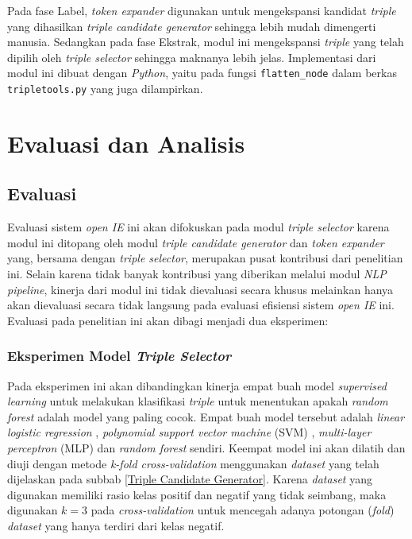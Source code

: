Pada fase Label, \textit{token expander} digunakan untuk mengekspansi kandidat \textit{triple} yang dihasilkan \textit{triple candidate generator} sehingga lebih mudah dimengerti manusia. Sedangkan pada fase Ekstrak, modul ini mengekspansi \textit{triple} yang telah dipilih oleh \textit{triple selector} sehingga maknanya lebih jelas. Implementasi dari modul ini dibuat dengan \textit{Python}, yaitu pada fungsi \verb|flatten_node| dalam berkas \verb|tripletools.py| yang juga dilampirkan.

\section{Evaluasi dan Analisis}

\subsection{Evaluasi}

Evaluasi sistem \textit{open IE} ini akan difokuskan pada modul \textit{triple selector} karena modul ini ditopang oleh modul \textit{triple candidate generator} dan \textit{token expander} yang, bersama dengan \textit{triple selector}, merupakan pusat kontribusi dari penelitian ini. Selain karena tidak banyak kontribusi yang diberikan melalui modul \textit{NLP pipeline}, kinerja dari modul ini tidak dievaluasi secara khusus melainkan hanya akan dievaluasi secara tidak langsung pada evaluasi efisiensi sistem \textit{open IE} ini. Evaluasi pada penelitian ini akan dibagi menjadi dua eksperimen:

\subsubsection{Eksperimen Model \textit{Triple Selector}}

Pada eksperimen ini akan dibandingkan kinerja empat buah model \textit{supervised learning} untuk melakukan klasifikasi \textit{triple} untuk menentukan apakah \textit{random forest} \citep{wasserman2015grid} adalah model yang paling cocok. Empat buah model tersebut adalah \textit{linear logistic regression}  \citep{fan2008liblinear}, \textit{polynomial support vector machine} (SVM) \citep{chang2011libsvm}, \textit{multi-layer perceptron} (MLP) \citep{hinton1989connectionist} dan \textit{random forest} sendiri. Keempat model ini akan dilatih dan diuji dengan metode \textit{k-fold cross-validation} menggunakan \textit{dataset} yang telah dijelaskan pada subbab \ref{Triple Candidate Generator}. Karena \textit{dataset} yang digunakan memiliki rasio kelas positif dan negatif yang tidak seimbang, maka digunakan $k = 3$ pada \textit{cross-validation} untuk mencegah adanya potongan (\textit{fold}) \textit{dataset} yang hanya terdiri dari kelas negatif.

